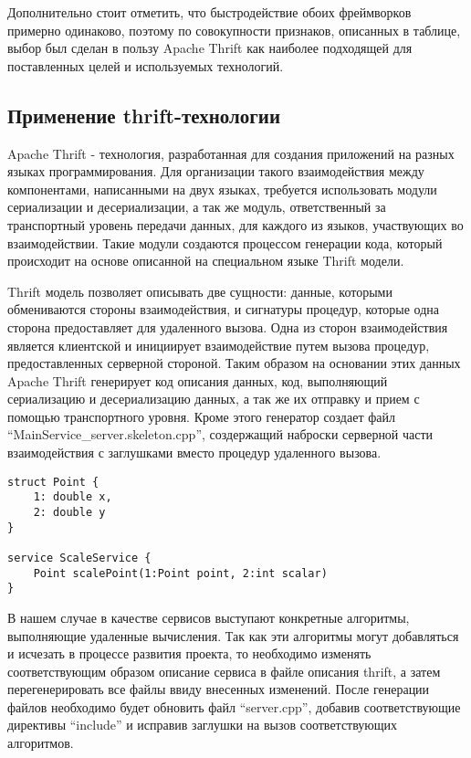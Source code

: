 Дополнительно стоит отметить, что быстродействие обоих фреймворков примерно
одинаково, поэтому по совокупности признаков, описанных в таблице, выбор был
сделан в пользу Apache Thrift как наиболее подходящей для поставленных целей и
используемых технологий.

\subsection{Применение thrift-технологии}

Apache Thrift\cite{thrift} - технология, разработанная для создания приложений на
разных языках программирования. Для организации такого взаимодействия между
компонентами, написанными на двух языках, требуется использовать модули
сериализации и десериализации, а так же модуль, ответственный за транспортный
уровень передачи
данных, для каждого из языков, участвующих во взаимодействии. Такие модули
создаются процессом генерации кода, который происходит на основе описанной на
специальном языке Thrift модели.

Thrift модель позволяет описывать две сущности: данные, которыми обмениваются
стороны взаимодействия, и сигнатуры процедур, которые одна сторона
предоставляет для удаленного вызова. Одна из сторон взаимодействия является
клиентской и инициирует взаимодействие путем вызова процедур, предоставленных
серверной стороной. Таким образом на основании этих данных Apache Thrift
генерирует код описания данных, код, выполняющий сериализацию и десериализацию
данных, а так же их отправку и прием с помощью транспортного уровня. Кроме этого
генератор создает файл ``MainService\_server.skeleton.cpp'', создержащий наброски
серверной части взаимодействия с заглушками вместо процедур удаленного вызова.

\begin{lstlisting}[caption={Пример описания модели и сервиса для технологии
Thrift}]
struct Point {
    1: double x,
    2: double y
}

service ScaleService {
    Point scalePoint(1:Point point, 2:int scalar)
}
\end{lstlisting}

В нашем случае в качестве сервисов выступают конкретные алгоритмы, выполняющие
удаленные вычисления. Так как эти алгоритмы могут добавляться и исчезать в
процессе развития проекта, то необходимо изменять соответствующим образом
описание сервиса в файле описания thrift, а затем перегенерировать все файлы
ввиду внесенных изменений. После генерации файлов необходимо будет обновить
файл ``server.cpp'', добавив соответствующие директивы ``include'' и исправив
заглушки на вызов соответствующих алгоритмов.

